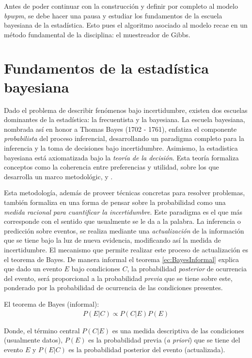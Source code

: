\documentclass[../Main/Main.tex]{subfiles}
\begin{document}
Antes de poder continuar con la construcción y definir por completo al modelo \textit{bpwpm}, se debe hacer una pausa y estudiar los fundamentos de la escuela bayesiana de la estadística. Esto pues el algoritmo asociado al modelo recae en un método fundamental de la disciplina: el muestreador de Gibbs.

\section{Fundamentos de la estadística bayesiana}
Dado el problema de describir fenómenos bajo incertidumbre, existen dos escuelas dominantes de la estadística: la frecuentista y la bayesiana. %
La escuela bayesiana, nombrada así en honor a Thomas Bayes (1702 - 1761), enfatiza el componente \textit{probabilista} del proceso inferencial, desarrollando un paradigma completo para la inferencia y la toma de decisiones bajo incertidumbre. Asimismo, la estadistica bayesiana está axiomatizada bajo la \textit{teoría de la decisión}. Esta teoría formaliza conceptos como la coherencia entre preferencias y utilidad, sobre los que desarrolla un marco metodológic, \citet{bernardo2001bayesian} y \citet{mendoza2011estadistica}.

Esta metodología, además de proveer técnicas concretas para resolver problemas, también formaliza en una forma de pensar sobre la probabilidad como una \textit{medida racional para cuantificar la incertidumbre}. Este paradigma es el que más corresponde con el sentido que usualmente se le da a la palabra. La inferencia o predicción sobre eventos, se realiza mediante una \textit{actualización} de la información que se tiene bajo la luz de nueva evidencia, modificando así la medida de incertidumbre. El mecanismo que permite realizar este proceso de actualización es el teorema de Bayes. De manera informal el teorema \eqref{ec:BayesInformal} explica que dado un evento $E$ bajo condiciones $C$, la probabilidad \textit{posterior} de ocurrencia del evento, será proporcional a la probabilidad \textit{previa} que se tiene sobre este, ponderado por la probabilidad de ocurrencia de las condiciones presentes. \\ %

\begin{theorem} El teorema de Bayes (informal):
\begin{align}
P(E|C) \propto P(C|E)P(E) \label{ec:BayesInformal}
\end{align}
\end{theorem}
\vspace*{-.7cm}
Donde, el término central $P(C|E)$ es una medida descriptiva de las condiciones (usualmente datos), $P(E)$ es la probabilidad previa (\textit{a priori}) que se tiene del evento $E$ y $P(E|C)$ es la probabilidad posterior del evento (actualizada).
\end{document}
